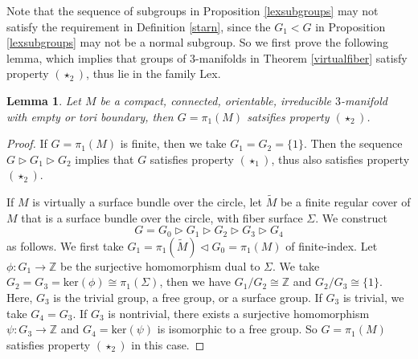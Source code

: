 \documentclass{amsart}
\numberwithin{equation}{section}
\newtheorem{lemma}[theorem]{Lemma}
\theoremstyle{definition}
\begin{document}
Note that the sequence of subgroups in Proposition \ref{lexsubgroups} may not satisfy the requirement in Definition \ref{starn}, since the $G_1<G$ in Proposition \ref{lexsubgroups} may not be a normal subgroup. So we first prove the following lemma, which implies that groups of $3$-manifolds in Theorem \ref{virtualfiber} satisfy property $(\star_2)$, thus lie in the family Lex.
\begin{lemma}\label{3manifoldstar2}
Let $M$ be a compact, connected, orientable, irreducible $3$-manifold with empty or tori boundary, then $G=\pi_1(M)$ satsifies property $(\star_2)$.
\end{lemma}
\begin{proof}
If $G=\pi_1(M)$ is finite, then we take $G_1=G_2=\{1\}$. Then the sequence $G\vartriangleright G_1\vartriangleright G_2$ implies that $G$ satisfies property $(\star_1)$, thus also satisfies property $(\star_2)$.

If $M$ is virtually a surface bundle over the circle, let $\tilde{M}$ be a finite regular cover of $M$ that is a surface bundle over the circle, with fiber surface $\Sigma$. We construct
$$G=G_0\vartriangleright G_1\vartriangleright G_2\vartriangleright G_3\vartriangleright G_4$$ 
as follows. We first take $G_1=\pi_1(\tilde{M}) \vartriangleleft G_0=\pi_1(M)$ of finite-index. Let $\phi: G_1\to \mathbb{Z}$ be the surjective homomorphism dual to $\Sigma$. We take $G_2=G_3=\text{ker}(\phi)\cong \pi_1(\Sigma)$, then we have $G_1/G_2\cong \mathbb{Z}$ and $G_2/G_3\cong \{1\}$. Here, $G_3$ is the trivial group, a free group, or a surface group. If $G_3$ is trivial, we take $G_4=G_3$. If $G_3$ is nontrivial, there exists a surjective homomorphism $\psi: G_3 \to \mathbb{Z}$ and $G_4=\text{ker}(\psi)$ is isomorphic to a free group. So $G=\pi_1(M)$ satisfies property $(\star_2)$ in this case.


\end{proof}
\end{document}
